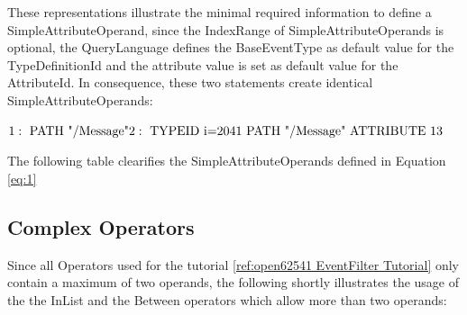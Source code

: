 \documentclass[10pt]{scrreprt}
\begin{document}
These representations illustrate the minimal required information to define a SimpleAttributeOperand, since the IndexRange of SimpleAttributeOperands is optional,
the QueryLanguage defines the BaseEventType as default value for the TypeDefinitionId and the attribute value is set as default value for the AttributeId.
In consequence, these two statements create identical SimpleAttributeOperands:

\begin{addmargin}[125pt]{0pt}
    $
    1: \text{   } \text{PATH "/Message"} \newline
    2: \text{   } \text{TYPEID i=2041 PATH "/Message" ATTRIBUTE 13} \newline
    $
\end{addmargin}

The following table clearifies the SimpleAttributeOperands defined in Equation \ref{eq:1}

\begin{table}[h]
    \centering
    \caption{SelectClauses}
    \label{tab:selectClauses}
\end{table}

\subsection{Complex Operators}
Since all Operators used for the tutorial \ref{ref:open62541 EventFilter Tutorial} only contain a maximum of two operands,
the following shortly illustrates the usage of the the InList and the Between operators which allow more than two operands:
\end{document}
